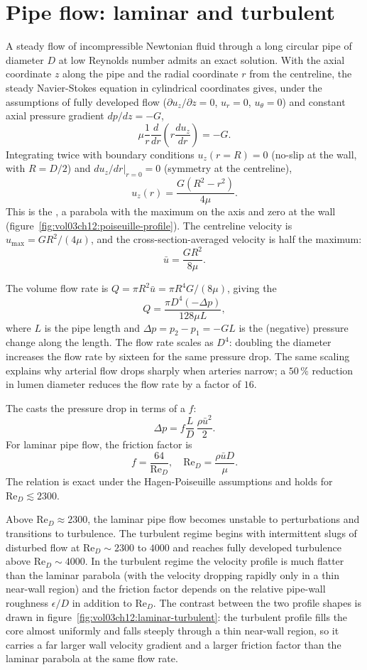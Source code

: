 \section{Pipe flow: laminar and turbulent}

A steady flow of incompressible Newtonian fluid through a long
circular pipe of diameter $D$ at low Reynolds number admits an
exact solution. With the axial coordinate $z$ along the pipe and
the radial coordinate $r$ from the centreline, the steady
Navier-Stokes equation in cylindrical coordinates gives, under
the assumptions of fully developed flow ($\partial u_z/\partial z
= 0$, $u_r = 0$, $u_\theta = 0$) and constant axial pressure
gradient $dp/dz = -G$,
\[
\mu\frac{1}{r}\frac{d}{dr}\left(r\frac{du_z}{dr}\right) = -G.
\]
Integrating twice with boundary conditions $u_z(r=R) = 0$ (no-slip
at the wall, with $R = D/2$) and $du_z/dr |_{r=0} = 0$ (symmetry
at the centreline),
\[
u_z(r) = \frac{G(R^2 - r^2)}{4\mu}.
\]
This is the , a
parabola with the maximum on the axis and zero at the wall
(figure~\ref{fig:vol03ch12:poiseuille-profile}). The
centreline velocity is $u_{\max} = GR^2/(4\mu)$, and the
cross-section-averaged velocity is half the maximum:
\[
\bar{u} = \frac{GR^2}{8\mu}.
\]


The volume flow rate is $Q = \pi R^2 \bar{u} = \pi R^4 G/(8\mu)$,
giving the 
\[
Q = \frac{\pi D^4 (-\Delta p)}{128 \mu L},
\]
where $L$ is the pipe length and $\Delta p = p_2 - p_1 = -GL$ is
the (negative) pressure change along the length. The flow rate
scales as $D^4$: doubling the diameter increases the flow rate by
sixteen for the same pressure drop. The same scaling explains why
arterial flow drops sharply when arteries narrow; a $50\,\%$
reduction in lumen diameter reduces the flow rate by a factor of
$16$.

The  casts the pressure drop in
terms of a  $f$:
\[
\Delta p = f\frac{L}{D}\,\frac{\rho \bar{u}^2}{2}.
\]
For laminar pipe flow, the friction factor is
\[
f = \frac{64}{\text{Re}_D}, \quad \text{Re}_D = \frac{\rho \bar{u} D}{\mu}.
\]
The relation is exact under the Hagen-Poiseuille assumptions and
holds for $\text{Re}_D \lesssim 2300$.

Above $\text{Re}_D \approx 2300$, the laminar pipe flow becomes
unstable to perturbations and transitions to turbulence. The
turbulent regime begins with intermittent slugs of disturbed flow
at $\text{Re}_D \sim 2300$ to $4000$ and reaches fully developed
turbulence above $\text{Re}_D \sim 4000$. In the turbulent regime
the velocity profile is much flatter than the laminar parabola
(with the velocity dropping rapidly only in a thin near-wall
region) and the friction factor depends on the relative pipe-wall
roughness $\epsilon/D$ in addition to $\text{Re}_D$. The contrast
between the two profile shapes is drawn in
figure~\ref{fig:vol03ch12:laminar-turbulent}: the turbulent
profile fills the core almost uniformly and falls steeply through
a thin near-wall region, so it carries a far larger wall velocity
gradient and a larger friction factor than the laminar parabola at
the same flow rate.

